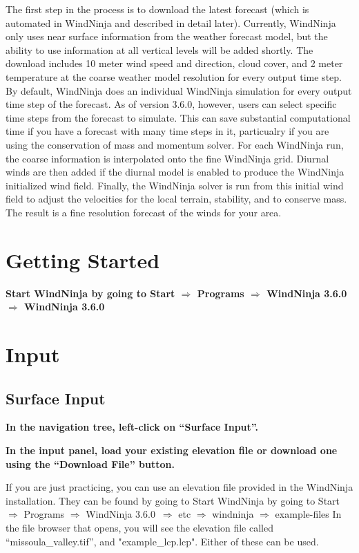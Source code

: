 \documentclass[12pt]{article}
\newcommand\vn{3.6.0}
\begin{document}
The first step in the process is to download the latest forecast (which is automated in WindNinja and described in detail later).  Currently, WindNinja only uses near surface information from the weather forecast model, but the ability to use information at all vertical levels will be added shortly.  The download includes 10 meter wind speed and direction, cloud cover, and 2 meter temperature at the coarse weather model resolution for every output time step.  By default, WindNinja does an individual WindNinja simulation for every output time step of the forecast.  As of version 3.6.0, however, users can select specific time steps from the forecast to simulate. This can save substantial computational time if you have a forecast with many time steps in it, particualry if you are using the conservation of mass and momentum solver. For each WindNinja run, the coarse information is interpolated onto the fine WindNinja grid.  Diurnal winds are then added if the diurnal model is enabled to produce the WindNinja initialized wind field.  Finally, the WindNinja solver is run from this initial wind field to adjust the velocities for the local terrain, stability, and to conserve mass.  The result is a fine resolution forecast of the winds for your area.

\section{Getting Started}

\textbf{\color{red}Start WindNinja by going to Start $\Rightarrow$ Programs $\Rightarrow$ WindNinja \vn\ $\Rightarrow$ WindNinja \vn\ }

\section{Input}
\subsection{Surface Input}

\textbf{\color{red} In the navigation tree, left-click on “Surface Input”.}

\textbf{\color{red} In the input panel, load your existing elevation file or download one using the “Download File” button.}

If you are just practicing, you can use an elevation file provided in the WindNinja installation.  They can be found by going to Start WindNinja by going to Start $\Rightarrow$ Programs $\Rightarrow$ WindNinja \vn\ $\Rightarrow$ etc $\Rightarrow$ windninja $\Rightarrow$ example-files  In the file browser that opens, you will see the elevation file called “missoula\_valley.tif”, and "example\_lcp.lcp". Either of these can be used.
\end{document}
